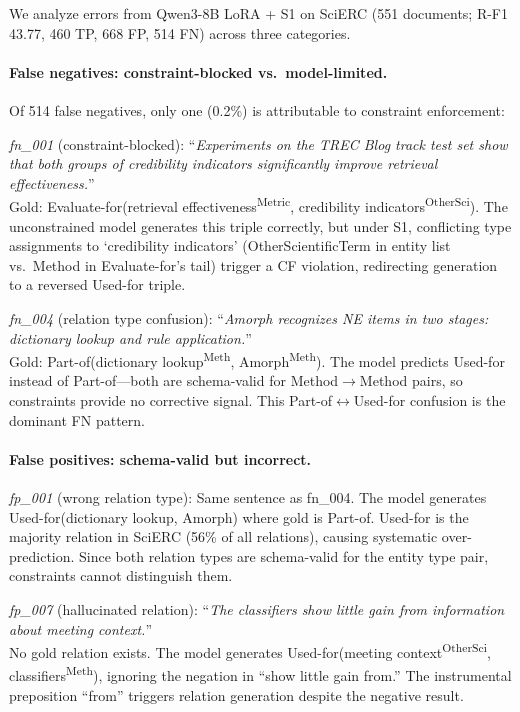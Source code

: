 We analyze errors from Qwen3-8B LoRA + S1 on SciERC (551 documents; R-F1 43.77, 460 TP, 668 FP, 514 FN) across three categories.

\paragraph{False negatives: constraint-blocked vs.\ model-limited.}
Of 514 false negatives, only one (0.2\%) is attributable to constraint enforcement:

\noindent\textit{fn\_001} (constraint-blocked): ``\textit{Experiments on the TREC Blog track test set show that both groups of credibility indicators significantly improve retrieval effectiveness.}'' \\
Gold: Evaluate-for(retrieval effectiveness\textsuperscript{Metric}, credibility indicators\textsuperscript{OtherSci}).
The unconstrained model generates this triple correctly, but under S1, conflicting type assignments to `credibility indicators' (OtherScientificTerm in entity list vs.\ Method in Evaluate-for's tail) trigger a CF violation, redirecting generation to a reversed Used-for triple.

\noindent\textit{fn\_004} (relation type confusion): ``\textit{Amorph recognizes NE items in two stages: dictionary lookup and rule application.}'' \\
Gold: Part-of(dictionary lookup\textsuperscript{Meth}, Amorph\textsuperscript{Meth}).
The model predicts Used-for instead of Part-of---both are schema-valid for Method$\to$Method pairs, so constraints provide no corrective signal. This Part-of$\leftrightarrow$Used-for confusion is the dominant FN pattern.

\paragraph{False positives: schema-valid but incorrect.}

\noindent\textit{fp\_001} (wrong relation type): Same sentence as fn\_004. The model generates Used-for(dictionary lookup, Amorph) where gold is Part-of. Used-for is the majority relation in SciERC (56\% of all relations), causing systematic over-prediction. Since both relation types are schema-valid for the entity type pair, constraints cannot distinguish them.

\noindent\textit{fp\_007} (hallucinated relation): ``\textit{The classifiers show little gain from information about meeting context.}'' \\
No gold relation exists. The model generates Used-for(meeting context\textsuperscript{OtherSci}, classifiers\textsuperscript{Meth}), ignoring the negation in ``show little gain from.'' The instrumental preposition ``from'' triggers relation generation despite the negative result.

